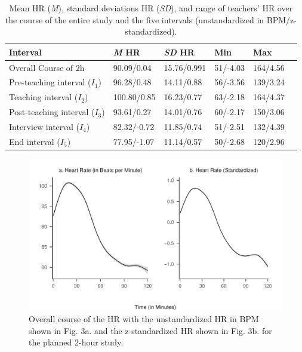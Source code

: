 \documentclass[preprint, 3p,
authoryear]{elsarticle} %
\begin{document}
\renewcommand{\arraystretch}{1.5}

\begin{table}[ht]
    \centering
    \begin{tabularx}{\textwidth}{lXXXXX}
        \toprule
        Interval & \textit{M} HR & \textit{SD} HR & Min & Max \\
        \midrule
        Overall Course of 2h & 90.09/0.04\footnotemark[9] & 15.76/0.991 & 51/-4.03 & 164/4.56 \\
        Pre-teaching interval ($I_1$) & 96.28/0.48 & 14.11/0.88 & 56/-3.56 & 139/3.24 \\
        Teaching interval ($I_2$) & 100.80/0.85 & 16.23/0.77 & 63/-2.18 & 164/4.37 \\
        Post-teaching interval ($I_3$) & 93.61/0.27 & 14.01/0.76 & 60/-2.17 & 150/3.06 \\
        Interview interval ($I_4$) & 82.32/-0.72 & 11.85/0.74 & 51/-2.51 & 132/4.39 \\
        End interval ($I_5$) & 77.95/-1.07 & 11.14/0.57 & 50\footnotemark[10]/-2.68 & 120/2.96 \\
        \bottomrule
    \end{tabularx}
    \caption{Mean HR (\textit{M}), standard deviations HR (\textit{SD}), and range of teachers’ HR over the course of the entire study and the five intervals (unstandardized in BPM/z-standardized).}
    \label{tab_1}

    
\end{table}

\begin{figure}[H]
  \centering
  \includegraphics[width=1\textwidth]{plots_publication/loess_plot_std_unstd_new.pdf}
  \caption{Overall course of the HR with the unstandardized HR in BPM shown in Fig. 3a. and the z-standardized HR shown in Fig. 3b. for the planned 2-hour study.}
  \label{Overall course of the HR with the unstandardized HR in BPM shown in Fig. 3a. and the z-standardized HR shown in Fig. 3b. for the planned 2-hour study.}
\end{figure}
\end{document}
